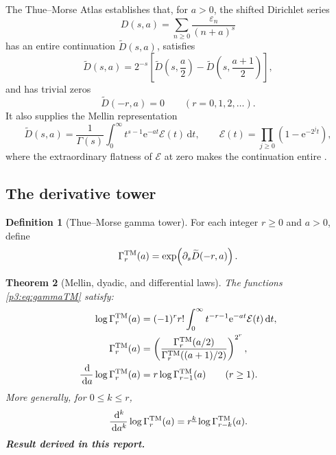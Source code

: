 \documentclass[11pt,oneside]{article}
\numberwithin{equation}{section}
\newtheorem{theorem}{Theorem}[section]
\theoremstyle{definition}
\newtheorem{definition}[theorem]{Definition}
\theoremstyle{remark}
\newcommand{\e}{\mathrm e}
\newcommand{\dd}{\,\mathrm d}
\newcommand{\eps}{\varepsilon}
\newcommand{\fall}[2]{#1^{\underline{#2}}}
\newcommand{\newresult}{\textbf{Result derived in this report.}}
\begin{document}
The Thue--Morse Atlas establishes that, for $a>0$, the shifted Dirichlet series
\begin{equation}
 D(s,a)=\sum_{n\ge0}\frac{\eps_n}{(n+a)^s}
 \label{p3:eq:Dsa}
\end{equation}
has an entire continuation $\widetilde D(s,a)$, satisfies
\begin{equation}
 \widetilde D(s,a)=2^{-s}\left[
 \widetilde D\!\left(s,\frac a2\right)
 -\widetilde D\!\left(s,\frac{a+1}{2}\right)\right],
 \label{p3:eq:D-dyadic}
\end{equation}
and has trivial zeros
\begin{equation}
 \widetilde D(-r,a)=0\qquad(r=0,1,2,\ldots).
 \label{p3:eq:Dzeros}
\end{equation}
It also supplies the Mellin representation
\begin{equation}
 \widetilde D(s,a)=\frac1{\Gamma(s)}
 \int_0^\infty t^{s-1}\e^{-at}\mathcal E(t)\dd t,
 \qquad
 \mathcal E(t)=\prod_{j\ge0}(1-\e^{-2^jt}),
 \label{p3:eq:D-Mellin}
\end{equation}
where the extraordinary flatness of $\mathcal E$ at zero makes the continuation entire
\cite{p3:proveit-atlas,p3:toth2022}.

\subsection{The derivative tower}

\begin{definition}[Thue--Morse gamma tower]
For each integer $r\ge0$ and $a>0$, define
\begin{equation}
 \Gamma_r^{\rm TM}(a)
 =\exp\!\left(\partial_s\widetilde D(-r,a)\right).
 \label{p3:eq:gammaTM}
\end{equation}
\end{definition}

\begin{theorem}[Mellin, dyadic, and differential laws]
\label{p3:thm:gamma-tower}
The functions \eqref{p3:eq:gammaTM} satisfy:
\begin{align}
 \log\Gamma_r^{\rm TM}(a)
 &=(-1)^rr!\int_0^\infty
 t^{-r-1}\e^{-at}\mathcal E(t)\dd t,
 \label{p3:eq:gamma-Mellin}\\
 \Gamma_r^{\rm TM}(a)
 &=\left(
 \frac{\Gamma_r^{\rm TM}(a/2)}
 {\Gamma_r^{\rm TM}((a+1)/2)}
 \right)^{2^r},
 \label{p3:eq:gamma-dyadic}\\
 \frac{\dd}{\dd a}\log\Gamma_r^{\rm TM}(a)
 &=r\log\Gamma_{r-1}^{\rm TM}(a)
 \qquad(r\ge1).
 \label{p3:eq:gamma-differential}
\end{align}
More generally, for $0\le k\le r$,
\begin{equation}
 \frac{\dd^k}{\dd a^k}\log\Gamma_r^{\rm TM}(a)
 =\fall{r}{k}\log\Gamma_{r-k}^{\rm TM}(a).
 \label{p3:eq:gamma-iterated}
\end{equation}
\newresult
\end{theorem}
\end{document}
